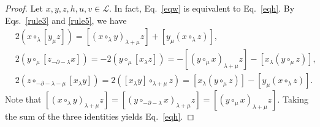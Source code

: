\documentclass[11pt,letterpaper,reqno]{amsart}
\theoremstyle{definition}
\numberwithin{equation}{section}
\begin{document}
\begin{proof}
Let $x,y,z,h,u,v \in \mathcal{L}$. In fact, Eq.~\eqref{eqw} is equivalent to Eq.~\eqref{eqh}. By Eqs.~\eqref{rule3} and \eqref{rule5}, we have
   \begin{align*}
      &{2} (x\circ_{\lambda}[y_{\mu}z])=[(x\circ_{\lambda}y)_{\lambda+\mu}z]+[y_{\mu}(x\circ_{\lambda}z)],	\\
      &{2} (y\circ_{\mu}[z_{-\partial-\lambda}x])=-{2} (y\circ_{\mu}[x_{\lambda}z])=-[(y\circ_{\mu}x)_{\lambda+\mu}z]-[x_{\lambda}(y\circ_{\mu}z)],\\
      &{2} (z\circ_{-\partial-\lambda-\mu}[x_{\lambda}y])={2} ([x_{\lambda}y]\circ_{\lambda+\mu}z)=[x_{{\lambda}}(y\circ_{\mu}z)]-[y_{\mu}(x\circ_{\lambda}z)].
   \end{align*}
Note that $[(x\circ_{\lambda}y)_{\lambda+\mu}z]=[(y\circ_{-\partial-\lambda}x)_{\lambda+\mu}z]=[(y\circ_{\mu}x)_{\lambda+\mu}z]$. Taking the sum of the three identities yields Eq.~\eqref{eqh}.


\end{proof}
\end{document}
